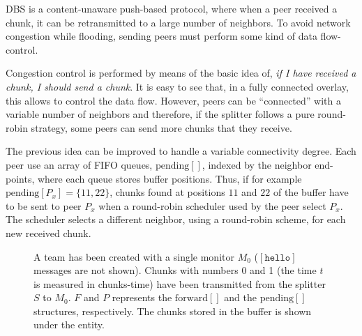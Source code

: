 
\label{sec:chunk_flooding}

\begin{comment}
\begin{figure*}
  \fig{300}{3cm}{peer_chunk_flooding}
  \caption{Chunk flooding at peers.\label{fig:peer_chunk_flooding}}
\end{figure*}
\end{comment}

DBS is a content-unaware push-based protocol, where when a peer
received a chunk, it can be retransmitted to a large number of
neighbors. To avoid network congestion while flooding, sending peers
must perform some kind of data flow-control.


Congestion control is performed by means of the basic idea of, {\sl if
  I have received a chunk, I should send a chunk}. It is easy to see
that, in a fully connected overlay, this allows to control the data
flow. However, peers can be ``connected'' with a variable number of
neighbors and therefore, if the splitter follows a pure round-robin
strategy, some peers can send more chunks that they receive.

The previous idea can be improved to handle a variable connectivity
degree. Each peer use an array of FIFO queues, $\text{pending}[]$,
indexed by the neighbor end-points, where each queue stores buffer
positions. Thus, if for example $\text{pending}[P_x]=\{11,22\}$,
chunks found at positions $11$ and $22$ of the buffer have to be sent
to peer $P_x$ when a round-robin scheduler used by the peer select
$P_x$. The scheduler selects a different neighbor, using a round-robin
scheme, for each new received chunk.

\begin{figure*}
   \caption{A team has been created with a
    single monitor $M_0$ ($[\mathtt{hello}]$ messages are not
    shown). Chunks with numbers 0 and 1 (the time $t$ is measured in
    chunks-time) have been transmitted from the splitter $S$ to
    $M_0$. $F$ and $P$ represents the $\text{forward}[]$ and the
    $\text{pending}[]$ structures, respectively. The chunks stored in
    the buffer is shown under the entity.\label{fig:team_0}}
\end{figure*}

